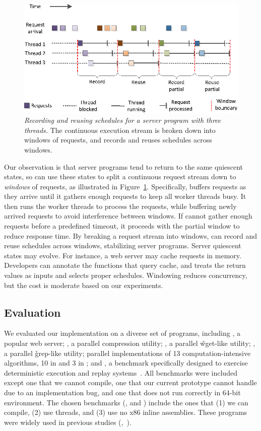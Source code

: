 \begin{figure}[t]
\includegraphics[width=0.7\linewidth]{peregrine/figures/window-idea}
\caption{{\em Recording and reusing schedules for a server program with
    three threads.}  The continuous execution stream is broken down into
  windows of requests, and \peregrine records and reuses schedules across
  windows.} \label{fig:window}
\end{figure}

Our observation is that server programs tend to return to the same
quiescent states, so \peregrine can use these states to split a continuous
request stream down to \emph{windows} of requests, as illustrated in
Figure~\ref{fig:window}.  Specifically, \peregrine buffers requests as they
arrive until it gathers enough requests to keep all worker threads busy.
It then runs the worker threads to process the requests, while buffering
newly arrived requests to avoid interference between windows.  If \peregrine
cannot gather enough requests before a predefined timeout, it proceeds
with the partial window to reduce response time.  By breaking a request
stream into windows, \peregrine can record and reuse schedules across
windows, stabilizing server programs.  
Server quiescent states may evolve.  For instance, a web server may cache
requests in memory.  Developers can annotate the functions that query
cache, and \peregrine treats the return values as inputs and selects proper
schedules.
Windowing reduces concurrency, but the cost is moderate based on our 
experiments.

\subsection{Evaluation} \label{sec:peregrine-eval}
We evaluated our \peregrine implementation on a diverse set of \nprog programs,
including \apache, a popular web server; \pbzip, a parallel compression
utility; \aget, a parallel \v{wget}-like utility; \pfscan, a parallel
\v{grep}-like utility; parallel implementations of 13
computation-intensive algorithms, 10 in \splash and 3 in \parsec; and
\racey, a benchmark specifically designed to exercise deterministic
execution and replay systems~\cite{racy-stress}.  All \splash benchmarks
were included except one that we cannot compile, one that our current prototype
cannot handle due to an implementation bug, and one that does not run
correctly in 64-bit environment.  The chosen \parsec benchmarks
(\blackscholes, \swaptions and \streamcluster) include the ones that (1)
we can compile, (2) use threads, and (3) use no x86 inline assemblies.
These programs were widely used in previous studies
(\eg,~\cite{lu:concurrency-bugs,syncfinder:osdi10,grace:oopsla09}).

